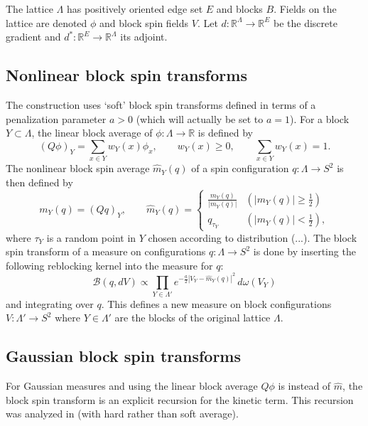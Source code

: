 \documentclass[11pt]{article}
\newcommand{\R}{\mathbb R}
\numberwithin{equation}{section}
\theoremstyle{definition}
\theoremstyle{plain}
\begin{document}
The lattice $\Lambda$ has positively oriented edge set $E$ and blocks $B$.
Fields on the lattice are denoted $\phi$ and block spin fields $V$.
Let $d:\R^\Lambda\to\R^E$ be the discrete gradient and $d^*:\R^E\to\R^\Lambda$ its adjoint.



\subsection{Nonlinear block spin transforms}

The construction uses `soft' block spin transforms defined in terms of a penalization parameter $a>0$
(which will actually be set to $a=1$).
For a block $Y \subset \Lambda$, the linear block average of $\phi: \Lambda \to \R$ is defined by
\begin{equation}
 (Q\phi)_Y=\sum_{x\in Y}w_Y(x)\phi_x,
 \qquad w_Y(x)\ge0,\qquad \sum_{x\in Y}w_Y(x)=1.
\end{equation}
The nonlinear block spin average $\widehat m_Y(q)$ of a spin configuration $q: \Lambda \to S^2$ is then defined by
\begin{equation} \label{eq:hatm}
  m_Y(q) = (Qq)_Y, \qquad \widehat m_Y(q) =
  \begin{cases}
      \frac{m_Y(q)}{|m_Y(q)|} & (|m_Y(q)|\geq \frac12)
      \\
      q_{\tau_Y} & (|m_Y(q)| < \frac12),
  \end{cases}
\end{equation}
where $\tau_Y$ is a random point in $Y$ chosen according to distribution (...).
The block spin transform of a measure on configurations $q: \Lambda \to S^2$ is done by inserting the following reblocking kernel into the measure for $q$:
\begin{equation} \label{eq:nl-block-average}
\mathcal B(q, dV)
\propto \prod_{Y \in \Lambda'} e^{-\frac{a}{2}|V_Y-\widehat m_Y(q)|^2} \, d\omega(V_Y)
\end{equation}
and integrating over $q$. This defines a new measure on block configurations $V :\Lambda' \to S^2$ where $Y\in\Lambda'$ are the blocks of the original lattice $\Lambda$.


\subsection{Gaussian block spin transforms}

For Gaussian measures and using the linear block average $Q\phi$ is instead of $\widehat m$,
the block spin transform is an explicit recursion for the kinetic term. This recursion was analyzed in
\cite{MR588686} (with hard rather than soft average).
\end{document}
